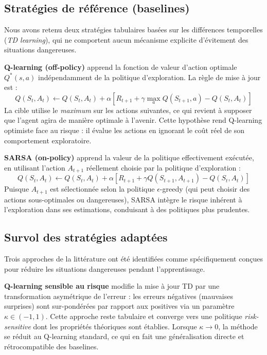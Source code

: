 \documentclass{article}
\begin{document}
\subsection{Stratégies de référence (baselines)}

Nous avons retenu deux stratégies tabulaires basées sur les différences temporelles (\textit{TD learning}), qui ne comportent aucun mécanisme explicite d'évitement des situations dangereuses.

\textbf{Q-learning (off-policy)} \citep{watkins1989qlearning} apprend la fonction de valeur d'action optimale $Q^*(s, a)$ indépendamment de la politique d'exploration. La règle de mise à jour est :
\begin{equation}
Q(S_t, A_t) \leftarrow Q(S_t, A_t) + \alpha \left[ R_{t+1} + \gamma \max_{a} Q(S_{t+1}, a) - Q(S_t, A_t) \right]
\label{eq:qlearning}
\end{equation}
La cible utilise le \textit{maximum} sur les actions suivantes, ce qui revient à supposer que l'agent agira de manière optimale à l'avenir. Cette hypothèse rend Q-learning optimiste face au risque : il évalue les actions en ignorant le coût réel de son comportement exploratoire.

\textbf{SARSA (on-policy)} \citep{rummery1994sarsa} apprend la valeur de la politique effectivement exécutée, en utilisant l'action $A_{t+1}$ réellement choisie par la politique d'exploration :
\begin{equation}
Q(S_t, A_t) \leftarrow Q(S_t, A_t) + \alpha \left[ R_{t+1} + \gamma Q(S_{t+1}, A_{t+1}) - Q(S_t, A_t) \right]
\label{eq:sarsa}
\end{equation}
Puisque $A_{t+1}$ est sélectionnée selon la politique $\epsilon$-greedy (qui peut choisir des actions sous-optimales ou dangereuses), SARSA intègre le risque inhérent à l'exploration dans ses estimations, conduisant à des politiques plus prudentes.

\subsection{Survol des stratégies adaptées}

Trois approches de la littérature ont été identifiées comme spécifiquement conçues pour réduire les situations dangereuses pendant l'apprentissage.

\textbf{Q-learning sensible au risque} \citep{mihatsch2002risksensitive} modifie la mise à jour TD par une transformation asymétrique de l'erreur : les erreurs négatives (mauvaises surprises) sont sur-pondérées par rapport aux positives via un paramètre $\kappa \in (-1, 1)$. Cette approche reste tabulaire et converge vers une politique \textit{risk-sensitive} dont les propriétés théoriques sont établies. Lorsque $\kappa \to 0$, la méthode se réduit au Q-learning standard, ce qui en fait une généralisation directe et rétrocompatible des baselines.
\end{document}
